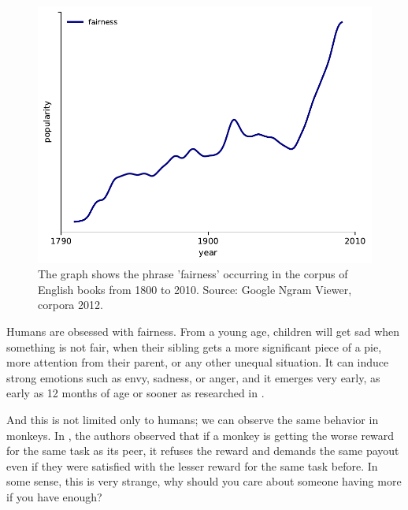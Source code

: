 \begin{figure}[htbp]
    \centering
    \includegraphics{img/google_ngram_fairness-eng_2012-1800-2000.pdf}
    \caption{The graph shows the phrase 'fairness' occurring in the corpus of English books from 1800 to 2010. Source: Google Ngram Viewer, corpora 2012. \cite{google_ngram_viewer_2012}}
    \label{fig:popularity_of_fairness}
\end{figure}

Humans are obsessed with fairness. From a young age, children will get sad when something is not fair, when their sibling gets a more significant piece of a pie, more attention from their parent, or any other unequal situation. It can induce strong emotions such as envy, sadness, or anger, and it emerges very early, as early as 12 months of age or sooner as researched in \cite{children_fairness}.

And this is not limited only to humans; we can observe the same behavior in monkeys. In \cite{brosnan2003monkeys}, the authors observed that if a monkey is getting the worse reward for the same task as its peer,  it refuses the reward and demands the same payout even if they were satisfied with the lesser reward for the same task before. In some sense, this is very strange, why should you care about someone having more if you have enough?

